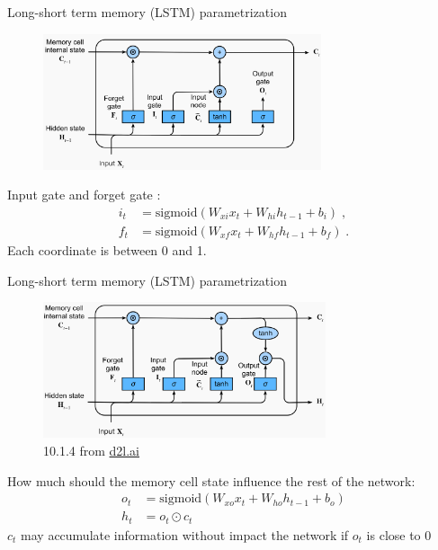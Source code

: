 \documentclass[usenames,dvipsnames,notes,11pt,aspectratio=169,hyperref={colorlinks=true, linkcolor=blue}]{beamer}
\begin{document}
\begin{frame}
    {Long-short term memory (LSTM) parametrization}
    \begin{figure}
        \includegraphics[height=4cm]{figures/lstm-2}
    \end{figure}

    Input gate and forget gate :
            \begin{align*}
 i_t &= \text{sigmoid}(W_{xi}x_t + W_{hi}h_{t-1} + b_i) \;,\\
 f_t &= \text{sigmoid}(W_{xf}x_t + W_{hf}h_{t-1} + b_f) \;.
            \end{align*}
    Each coordinate is between 0 and 1.
\end{frame}

\begin{frame}
    {Long-short term memory (LSTM) parametrization}
    \begin{figure}
        \includegraphics[height=4cm]{figures/lstm-3}
        \caption{10.1.4 from \href{https://d2l.ai/chapter_recurrent-modern/lstm.html}{d2l.ai}}
    \end{figure}
    How much should the memory cell state influence the rest of the network:
            \begin{align*}
 o_t &= \text{sigmoid}(W_{xo}x_t + W_{ho}h_{t-1} + b_o) \\
 h_t &= o_t \odot c_t 
            \end{align*}
    $c_t$ may accumulate information without impact the network if $o_t$ is close to 0
\end{frame}
\end{document}
